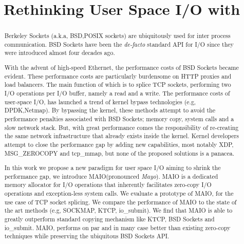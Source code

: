 \documentclass[sigconf,9pt]{acmart}
\title{Rethinking User Space I/O with \oursys}
\newcommand{\oursys}{MAIO\xspace}
\newcommand{\sockets}{BSD Sockets\xspace}
\begin{document}
\begin{abstract}
    Berkeley Sockets (a.k.a, BSD,POSIX sockets) are ubiquitously used for inter process communication. \sockets have been the \emph{de-facto} standard API for I/O since they were introduced almost four decades ago. 
    
    With the advent of high-speed Ethernet, the performance costs of \sockets became evident. These performance costs are particularly burdensome on HTTP proxies and load balancers. The main function of which is to splice TCP sockets, performing two I/O operations per I/O buffer, namely a read and a write. The performance costs of user-space I/O, has launched a trend of kernel bypass technologies (e.g, DPDK,Netmap). By bypassing the kernel, these methods attempt to avoid the performance penalties associated with \sockets; memory copy, system calls and a slow network stack. But, with great performance comes the responsibility of re-creating the same network infrastructure that already exists inside the kernel. Kernel developers attempt to close the performance gap by adding new capabilities, most notably XDP, MSG\_ZEROCOPY and tcp\_mmap, but none of the proposed solutions is a panacea.
    
    In this work we propose a new paradigm for user space I/O aiming to shrink the performance gap, we introduce \oursys (pronounced \emph{Mayo}). \oursys is a dedicated memory allocator for I/O operations that inherently facilitates 
    zero-copy I/O operations and exception-less system calls. We evaluate a prototype of \oursys, for the use case of TCP socket splicing. We compare the performance of \oursys to the state of the art methods (e.g, SOCKMAP, KTCP, io\_submit). We find that \oursys is able to greatly outperform standard copying mechanism like KTCP, \sockets and io\_submit. \oursys, performs on par and in many case better than existing zero-copy techniques while preserving the ubiquitous \sockets API. 
    
    
\end{abstract}
\end{document}
